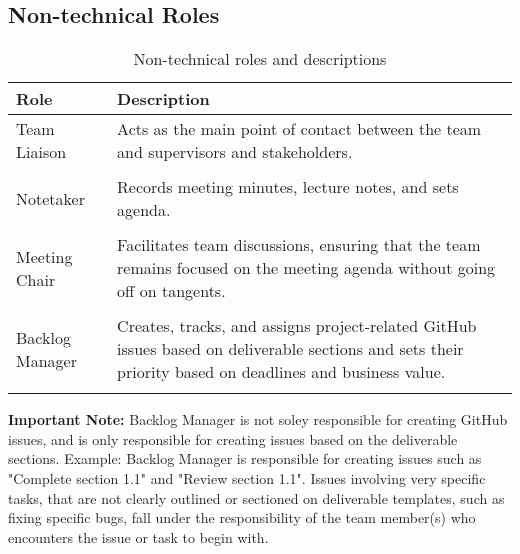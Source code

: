 \documentclass{article}
\begin{document}
\subsection{Non-technical Roles}
\begin{table}[ht]
\centering
\caption{Non-technical roles and descriptions}
\label{tab:non-technical-roles}
\begin{tabularx}{\textwidth}{lX}
\toprule
\textbf{Role} & \textbf{Description} \\
\midrule

Team Liaison & Acts as the main point of contact between the team and supervisors and stakeholders.  \\ \\
Notetaker & Records meeting minutes, lecture notes, and sets agenda. \\ \\
Meeting Chair & Facilitates team discussions, ensuring that the team remains focused on the meeting agenda without going off on tangents. \\ \\
Backlog Manager & Creates, tracks, and assigns project-related GitHub issues based on deliverable sections and sets their priority based on deadlines and business value.\\ \\
\bottomrule
\end{tabularx}
\end{table}

\noindent\textbf{Important Note:} Backlog Manager is not soley responsible for creating GitHub issues, and is only responsible for creating issues based on the deliverable sections. Example: Backlog
Manager is responsible for creating issues such as "Complete section 1.1" and "Review section 1.1". Issues involving very specific tasks, 
that are not clearly outlined or sectioned on deliverable templates, such as fixing specific bugs, fall under the responsibility of 
the team member(s) who encounters the issue or task to begin with.\\
\end{document}
